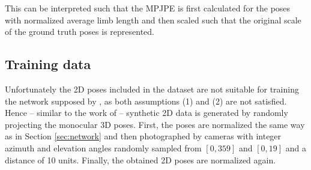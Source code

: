 This can be interpreted such that the MPJPE is first calculated for the poses with normalized average limb length and then scaled such that the original scale of the ground truth poses is represented. 

\subsection{Training data}\label{sec:data-results}

Unfortunately the 2D poses included in the dataset are not suitable for training the network supposed by \citet{drover18}, as both assumptions (1) and (2) are not satisfied.
Hence -- similar to the work of \citet{drover18} -- synthetic 2D data is generated by randomly projecting the monocular 3D poses.
First, the poses are normalized the same way as in Section \ref{sec:network} and then photographed by cameras with integer azimuth and elevation angles randomly sampled from $[0, 359]$ and $[0, 19]$ and a distance of 10 units.
Finally, the obtained 2D poses are normalized again.

